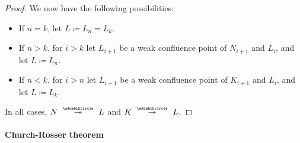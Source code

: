 \begin{proof}
  We now have the following possibilities:
  \begin{itemize}
    \item If \( n = k \), let \( L \coloneqq L_n = L_k \).
    \item If \( n > k \), for \( i > k \) let \( L_{i+1} \) be a weak confluence point of \( N_{i+1} \) and \( L_i \), and let \( L \coloneqq L_n \).
    \item If \( n < k \), for \( i > n \) let \( L_{i+1} \) be a weak confluence point of \( K_{i+1} \) and \( L_i \), and let \( L \coloneqq L_k \).
  \end{itemize}

  In all cases, \( N \pred* L \) and \( K \pred* L \).
\end{proof}

\paragraph{Church-Rosser theorem}

